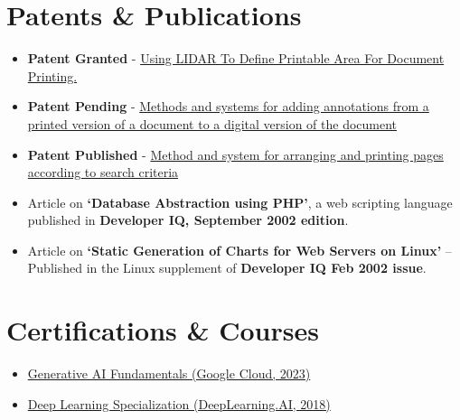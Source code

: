 \documentclass[a4paper,11pt]{article}
\begin{document}
\begin{multicols}{2}

\section*{Patents \& Publications}

\begin{itemize}
  \setlength\itemsep{-0.5em}

\item
  \textbf{Patent Granted} -
  \href{https://patents.justia.com/patent/12086483}{Using LIDAR To
    Define Printable Area For Document Printing.}
  
\item
  \textbf{Patent Pending} -
  \href{https://patents.google.com/patent/US20230289515A1}{Methods
    and systems for adding annotations from a printed version of a
    document to a digital version of the document}

\item \textbf{Patent Published} -
  \href{https://patents.google.com/patent/US20190294385A1}{Method and
    system for arranging and printing pages according to search
    criteria}

\item Article on \textbf{`Database Abstraction using PHP'}, a web scripting
  language published in \textbf{Developer IQ, September 2002 edition}.

\item Article on \textbf{`Static Generation of Charts for Web Servers
  on Linux'} – Published in the Linux supplement of
  \textbf{Developer IQ Feb 2002 issue}.

\end{itemize}


\section*{Certifications \& Courses}

\begin{itemize}
  
  \setlength\itemsep{-0.5em}

\item \href{https://partner.cloudskillsboost.google/public_profiles/c3662c2a-8b10-4480-9922-dc384a446a1d}{Generative AI Fundamentals (Google Cloud, 2023)}
  
\item
  \href{https://www.coursera.org/account/accomplishments/specialization/Y9XD9ZQ3EGG2}{Deep Learning Specialization (DeepLearning.AI, 2018)}
  

\end{itemize}
\end{multicols}
\end{document}
